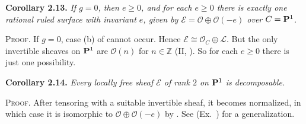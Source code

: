 {\medskip
\noindent\hypertarget{result-V-2.13}{}\textbf{Corollary 2.13.} \textit{If $g=0$, then $e\geq0$, and for each $e\geq0$ there is exactly one rational ruled surface with invariant $e$, given by $\mathcal E=\mathcal O\oplus\mathcal O(-e)$ over $C=\mathbf{P}^1$.}

\smallskip
\noindent\textsc{Proof.} If $g=0$, case (b) of  cannot occur. Hence $\mathcal E\cong\mathcal O_C\oplus\mathcal L$. But the only invertible sheaves on $\mathbf{P}^1$ are $\mathcal O(n)$ for $n\in\mathbb Z$ (II, ). So for each $e\geq0$ there is just one possibility.

\medskip
\noindent\hypertarget{result-V-2.14}{}\textbf{Corollary 2.14.} \textit{Every locally free sheaf $\mathcal E$ of rank $2$ on $\mathbf{P}^1$ is decomposable.}

\smallskip
\noindent\textsc{Proof.} After tensoring with a suitable invertible sheaf, it becomes normalized, in which case it is isomorphic to $\mathcal O\oplus\mathcal O(-e)$ by . See (Ex.~) for a generalization.
}
